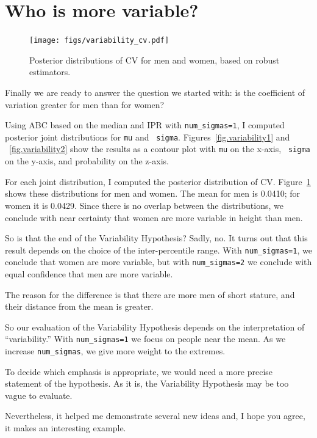\documentclass[12pt]{book}
\theoremstyle{exercise}
\begin{document}
\section{Who is more variable?}

\begin{figure}
\centerline{\texttt{[image: figs/variability\_cv.pdf]}}
\caption{Posterior distributions of CV for men and women, based on
robust estimators.}
\label{fig.variability3}
\end{figure}

Finally we are ready to answer the question we started with: is the
coefficient of variation greater for men than for women?

Using ABC based on the median and IPR with \verb"num_sigmas=1", I
computed posterior joint distributions for {\tt mu} and {\tt
  sigma}.  Figures~\ref{fig.variability1} and ~\ref{fig.variability2}
show the results as a contour plot with {\tt mu} on the x-axis, {\tt
  sigma} on the y-axis, and probability on the z-axis.

For each joint distribution, I computed the posterior distribution of
CV.  Figure~\ref{fig.variability3} shows these distributions for men
and women.  The mean for men is 0.0410; for women it is 0.0429.
Since there is no overlap between the distributions, we conclude with
near certainty that
women are more variable in height than men.

So is that the end of the Variability Hypothesis?  Sadly, no.  It turns
out that this
result depends on the choice of the
inter-percentile range.  With \verb"num_sigmas=1", we conclude that
women are more variable, but with \verb"num_sigmas=2" we conclude
with equal confidence that men are more variable.

The reason for the difference is that there
are more men of short stature, and their distance from the mean is
greater.

So our evaluation of the Variability Hypothesis depends on the
interpretation of ``variability.''  With \verb"num_sigmas=1" we
focus on people near the mean.  As we increase
\verb"num_sigmas", we give more weight to the extremes.  

To decide which
emphasis is appropriate, we would need a more precise statement
of the hypothesis.  As it is, the Variability Hypothesis may be
too vague to evaluate.

Nevertheless, it helped
me demonstrate several new ideas and, I hope you agree,
it makes an interesting example.
\end{document}
